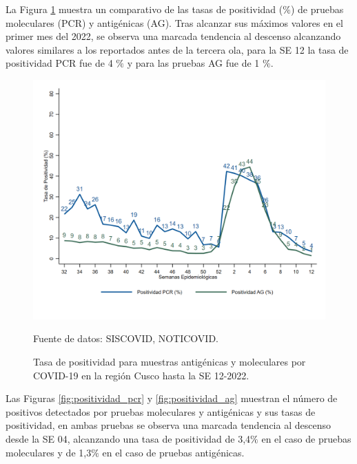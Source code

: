 \documentclass[12pt,a4paper,openany]{book}
\begin{document}
  La Figura \ref{fig:total_muestras_procesada} muestra un comparativo de las tasas de positividad ($\%$) de pruebas moleculares (PCR) y antigénicas (AG). Tras alcanzar sus máximos valores en el primer mes del 2022, se observa una marcada tendencia al descenso alcanzando valores similares a los reportados antes de la tercera ola, para la SE 12 la tasa de positividad PCR fue de 4 $\%$ y para las pruebas AG fue de 1 $\%$.
  
   \begin{figure}[h]
	\caption{Tasa de positividad para muestras antigénicas y moleculares por COVID-19 en la región Cusco hasta la SE 12-2022. }\label{fig:total_muestras_procesada}
	\begin{center}
		\includegraphics[width=0.75\linewidth]{../figuras/positividad_diaria_2021_2022.png}
	\end{center}
	{\footnotesize {Fuente de datos: SISCOVID, NOTICOVID.}}
\end{figure}


Las Figuras \ref{fig:positividad_pcr} y \ref{fig:positividad_ag} muestran el número de positivos detectados por pruebas moleculares y antigénicas y sus tasas de positividad, en ambas pruebas se observa una marcada tendencia al descenso desde la SE 04, alcanzando una tasa de positividad de 3,4$\%$ en el caso de pruebas moleculares y de 1,3$\%$ en el caso de pruebas antigénicas. 
\end{document}
